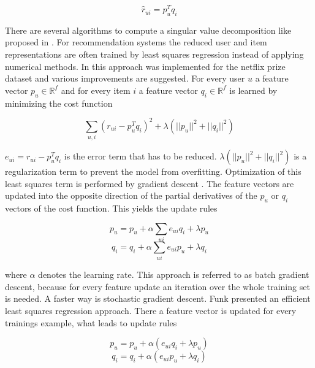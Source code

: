 \documentclass[10pt]{reportMaster}
\begin{document}
\begin{equation}
	\label{eq:linRegPrediction}
	\hat{r}_{ui} = p_u^T q_i
\end{equation}


There are several algorithms to compute a singular value decomposition like proposed in \cite{svdGolubSolution}.
For recommendation systems the reduced user and item representations are often trained by least squares regression instead of applying numerical methods.
In \cite{matrixFactorizationDifRegParam} this approach was implemented for the netflix prize dataset and various improvements are suggested.
For every user $u$ a feature vector $p_u \in \mathds{R}^f$ and for every item $i$ a feature vector $q_i \in \mathds{R}^f$ is learned by minimizing the cost function 

\begin{equation}
	\sum_{u, i}{(r_{ui} - p_u^T q_i)^2 + \lambda (||p_u||^2 + ||q_i||^2)}
\end{equation}

$e_{ui} = r_{ui} - p_u^T q_i$ is the error term that has to be reduced.
$\lambda (||p_u||^2 + ||q_i||^2)$ is a regularization term to prevent the model from overfitting.
Optimization of this least squares term is performed by gradient descent \cite{ngRegressionLectureNotes}.
The feature vectors are updated into the opposite direction of the partial derivatives of the $p_u$ or $q_i$ vectors of the cost function.
This yields the update rules

\begin{equation}
\label{eq:updateLinRegP}
	p_u = p_u + \alpha \sum_{ui}{e_{ui} q_i + \lambda p_u}
\end{equation}
\begin{equation}
\label{eq:updateLinRegQ}
	q_i = q_i + \alpha \sum_{ui}{e_{ui} p_u + \lambda q_i}
\end{equation}

where $\alpha$ denotes the learning rate.
This approach is referred to as batch gradient descent, because for every feature update an iteration over the whole training set is needed.
A faster way is stochastic gradient descent.
Funk \cite{funkLeastSquares} presented an efficient least squares regression approach.
There a feature vector is updated for every trainings example, what leads to update rules 

\begin{equation}
	p_u = p_u + \alpha (e_{ui} q_i + \lambda p_u)
\end{equation}
\begin{equation}
	q_i = q_i + \alpha (e_{ui} p_u + \lambda q_i)
\end{equation}
\end{document}
